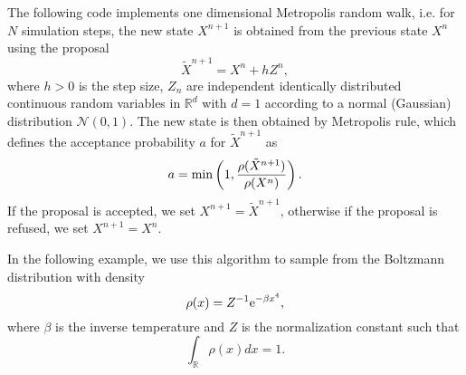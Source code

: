 \documentclass{scrartcl}
\newcommand{\R}{\mathbb{R}}
\begin{document}
The following code implements one dimensional Metropolis random walk, i.e. for $N$ simulation steps, the new state $X^{n+1}$ is obtained from the previous state $X^{n}$ using the proposal
\[
\tilde{X}^{n+1} = X^n + h Z^n,
\]
where $h>0$ is the step size, $Z_n$ are independent identically distributed continuous random variables in $\R^d$ with $d=1$ according to a normal (Gaussian) distribution $\mathcal{N}(0,1)$. The new state is then obtained by Metropolis rule, which defines the acceptance probability $a$ for $\tilde{X}^{n+1}$ as
\[
a  = {\rm min}\left(1, \frac{\rho(\tilde{X}^{n+1})}{\rho(X^n)}\right).
\]
If the proposal is accepted, we set $X^{n+1}=\tilde{X}^{n+1}$, otherwise if the proposal is refused, we set $X^{n+1}=X^{n}$. 

In the following example, we use this algorithm to sample from the Boltzmann distribution with density
\begin{equation}
\rho(x) = Z^{-1}{\rm e}^{-\beta x^4},
\label{quartic}
\end{equation}
where $\beta$ is the inverse temperature and $Z$ is the normalization constant such that
\[
\int_{\R} \rho(x)dx = 1.
\]
\end{document}
